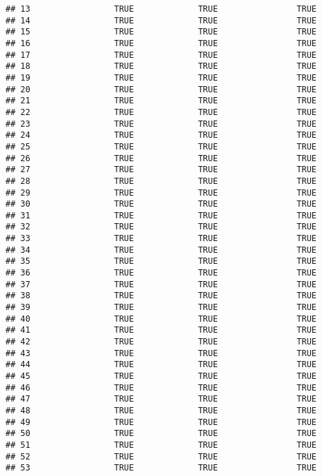 \documentclass[
]{article}
\begin{document}
\begin{verbatim}
## 13                 TRUE             TRUE                TRUE
## 14                 TRUE             TRUE                TRUE
## 15                 TRUE             TRUE                TRUE
## 16                 TRUE             TRUE                TRUE
## 17                 TRUE             TRUE                TRUE
## 18                 TRUE             TRUE                TRUE
## 19                 TRUE             TRUE                TRUE
## 20                 TRUE             TRUE                TRUE
## 21                 TRUE             TRUE                TRUE
## 22                 TRUE             TRUE                TRUE
## 23                 TRUE             TRUE                TRUE
## 24                 TRUE             TRUE                TRUE
## 25                 TRUE             TRUE                TRUE
## 26                 TRUE             TRUE                TRUE
## 27                 TRUE             TRUE                TRUE
## 28                 TRUE             TRUE                TRUE
## 29                 TRUE             TRUE                TRUE
## 30                 TRUE             TRUE                TRUE
## 31                 TRUE             TRUE                TRUE
## 32                 TRUE             TRUE                TRUE
## 33                 TRUE             TRUE                TRUE
## 34                 TRUE             TRUE                TRUE
## 35                 TRUE             TRUE                TRUE
## 36                 TRUE             TRUE                TRUE
## 37                 TRUE             TRUE                TRUE
## 38                 TRUE             TRUE                TRUE
## 39                 TRUE             TRUE                TRUE
## 40                 TRUE             TRUE                TRUE
## 41                 TRUE             TRUE                TRUE
## 42                 TRUE             TRUE                TRUE
## 43                 TRUE             TRUE                TRUE
## 44                 TRUE             TRUE                TRUE
## 45                 TRUE             TRUE                TRUE
## 46                 TRUE             TRUE                TRUE
## 47                 TRUE             TRUE                TRUE
## 48                 TRUE             TRUE                TRUE
## 49                 TRUE             TRUE                TRUE
## 50                 TRUE             TRUE                TRUE
## 51                 TRUE             TRUE                TRUE
## 52                 TRUE             TRUE                TRUE
## 53                 TRUE             TRUE                TRUE

\end{verbatim}
\end{document}

